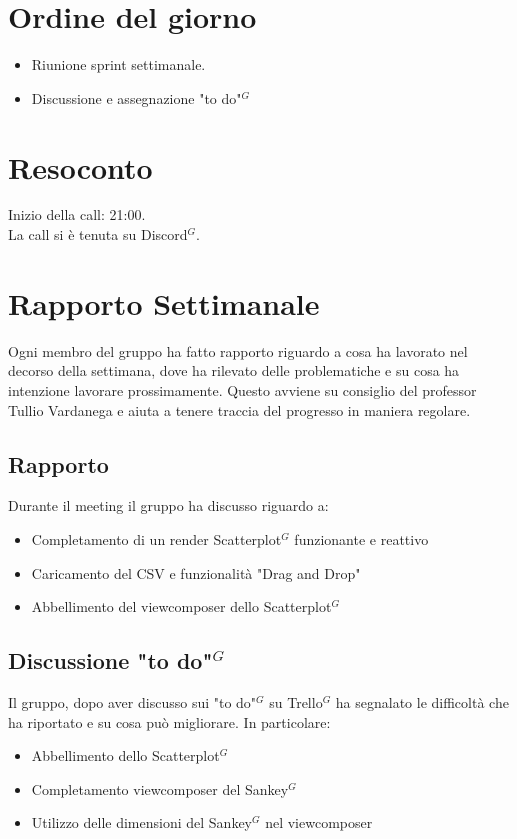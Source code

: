\section{Ordine del giorno}

\begin{itemize}
	\item Riunione sprint settimanale.
    \item Discussione e assegnazione "to do"$^{G}$ 
\end{itemize}

\section{Resoconto}

\noindent
Inizio della call: 21:00. \\
\noindent La call si è tenuta su Discord$^{G}$.
\section{Rapporto Settimanale}
Ogni membro del gruppo ha fatto rapporto riguardo a cosa ha lavorato nel decorso della settimana, dove ha rilevato delle problematiche e su cosa ha intenzione lavorare prossimamente.
Questo avviene su consiglio del professor Tullio Vardanega e aiuta a tenere traccia del progresso in maniera regolare.

\subsection{Rapporto}
Durante il meeting il gruppo ha discusso riguardo a:
\begin{itemize}
	\item Completamento di un render Scatterplot$^{G}$ funzionante e reattivo
	\item Caricamento del CSV e funzionalità "Drag and Drop"
	\item Abbellimento del viewcomposer dello Scatterplot$^{G}$
\end{itemize}

\subsection{Discussione "to do"$^{G}$}
Il gruppo, dopo aver discusso sui "to do"$^{G}$ su Trello$^{G}$ ha segnalato le difficoltà che ha riportato e su cosa può migliorare. In particolare:
\begin{itemize}
	\item Abbellimento dello Scatterplot$^{G}$
	\item Completamento viewcomposer del Sankey$^{G}$
	\item Utilizzo delle dimensioni del Sankey$^{G}$ nel viewcomposer
\end{itemize}

